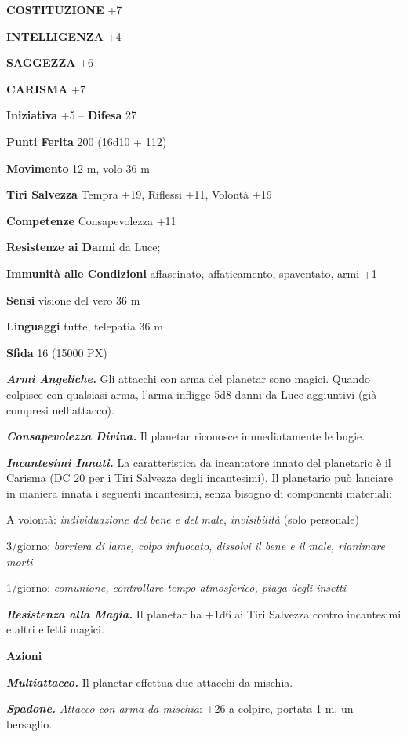 \begin{multicols}{2}
\textbf{COSTITUZIONE} +7

\textbf{INTELLIGENZA} +4

\textbf{SAGGEZZA} +6

\textbf{CARISMA} +7

\textbf{Iniziativa} +5 -- \textbf{Difesa} 27

\textbf{Punti Ferita} 200 (16d10 + 112)

\textbf{Movimento} 12 m, volo 36 m

\textbf{Tiri Salvezza} Tempra +19, Riflessi +11, Volontà +19

\textbf{Competenze} Consapevolezza +11

\textbf{Resistenze ai Danni} da Luce;

\textbf{Immunità alle Condizioni} affascinato, affaticamento, spaventato, armi +1

\textbf{Sensi} visione del vero 36 m

\textbf{Linguaggi} tutte, telepatia 36 m

\textbf{Sfida} 16 (15000 PX)

\textit{\textbf{Armi Angeliche.}} Gli attacchi con arma del planetar sono magici. Quando colpisce con qualsiasi arma, l'arma infligge 5d8 danni da Luce aggiuntivi (già compresi nell'attacco).

\textit{\textbf{Consapevolezza Divina.}} Il planetar riconosce immediatamente le bugie.

\textit{\textbf{Incantesimi Innati.}} La caratteristica da incantatore innato del planetario è il Carisma (DC 20 per i Tiri Salvezza degli incantesimi). Il planetario può lanciare in maniera innata i seguenti incantesimi, senza bisogno di componenti materiali:

A volontà: \textit{individuazione del bene e del male}, \textit{invisibilità} (solo personale)

3/giorno: \textit{barriera di lame, colpo infuocato, dissolvi il bene e il} \textit{male, rianimare morti}

1/giorno: \textit{comunione, controllare tempo atmosferico, piaga degli insetti}

\textit{\textbf{Resistenza alla Magia.}} Il planetar ha +1d6 ai Tiri Salvezza contro incantesimi e altri effetti magici.

\textbf{Azioni}

\textit{\textbf{Multiattacco.}} Il planetar effettua due attacchi da mischia.

\textit{\textbf{Spadone.} Attacco con arma da mischia}: +26 a colpire, portata 1 m, un bersaglio.


\end{multicols}
